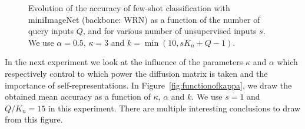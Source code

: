 \documentclass[a4paper,conference]{IEEEtran}
\begin{document}
\begin{figure}[h]
  \begin{center}
  \end{center}
  \vspace{-.5cm}
  \caption{Evolution of the accuracy of few-shot classification with miniImageNet (backbone: WRN) as a function of the number of query inputs $Q$, and for various number of unsupervised inputs $s$. We use $\alpha=0.5$, $\kappa=3$ and $k=\min(10,s K_n + Q - 1)$.}
  \label{fig:functionofq}
\end{figure}



In the next experiment we look at the influence of the parameters $\kappa$ and $\alpha$ which respectively control to which power the diffusion matrix is taken and the importance of self-representations. In Figure~\ref{fig:functionofkappa}, we draw the obtained mean accuracy as a function of $\kappa$, $\alpha$ and $k$. We use $s=1$ and $Q/K_n = 15$ in this experiment. There are multiple interesting conclusions to draw from this figure. 
\end{document}
